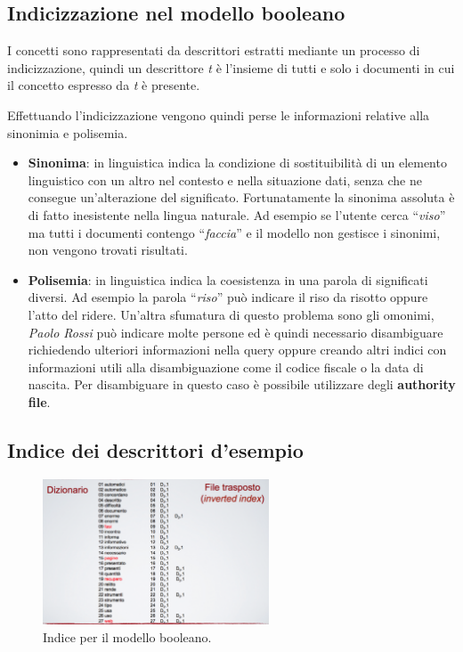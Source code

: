 \subsection{Indicizzazione nel modello booleano}

I concetti sono rappresentati da descrittori estratti mediante un processo di indicizzazione, quindi un descrittore \textit{t} è l'insieme di tutti e solo i documenti in cui il concetto espresso da \textit{t} è presente.

Effettuando l'indicizzazione vengono quindi perse le informazioni relative alla sinonimia e polisemia.

\begin{itemize}
	\item \textbf{Sinonima}: in linguistica indica la condizione di sostituibilità di un elemento linguistico con un altro nel contesto e nella situazione dati, senza che ne consegue un'alterazione del significato. Fortunatamente la sinonima assoluta è di fatto inesistente nella lingua naturale. Ad esempio se l'utente cerca ``\textit{viso}'' ma tutti i documenti contengo ``\textit{faccia}'' e il modello non gestisce i sinonimi, non vengono trovati risultati.
	\item \textbf{Polisemia}: in linguistica indica la coesistenza in una parola di significati diversi. Ad esempio la parola ``\textit{riso}'' può indicare il riso da risotto oppure l'atto del ridere. Un'altra sfumatura di questo problema sono gli omonimi, \textit{Paolo Rossi} può indicare molte persone ed è quindi necessario disambiguare richiedendo ulteriori informazioni nella query oppure creando altri indici con informazioni utili alla disambiguazione come il codice fiscale o la data di nascita. Per disambiguare in questo caso è possibile utilizzare degli \textbf{authority file}.
\end{itemize}

\subsection{Indice dei descrittori d'esempio}

\begin{figure}[htbp]
	\centering
	\includegraphics[width=0.6\textwidth]{./images/l7-index-bool}
	\caption{Indice per il modello booleano.}
\end{figure}

